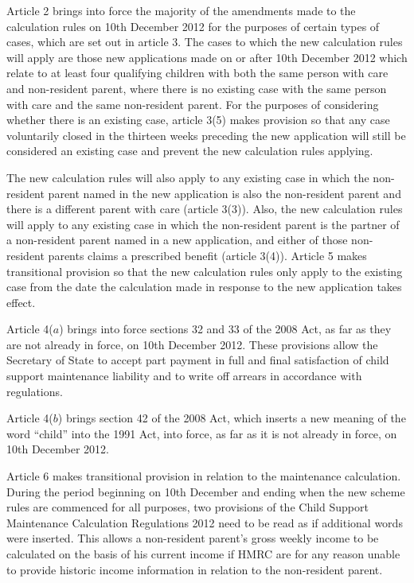 \documentclass[12pt,a4paper]{article}
\begin{document}
Article 2 brings into force the majority of the amendments made to the calculation rules on 10th December 2012 for the purposes of certain types of cases, which are set out in article 3. The cases to which the new calculation rules will apply are those new applications made on or after 10th December 2012 which relate to at least four qualifying children with both the same person with care and non-resident parent, where there is no existing case with the same person with care and the same non-resident parent. For the purposes of considering whether there is an existing case, article 3(5) makes provision so that any case voluntarily closed in the thirteen weeks preceding the new application will still be considered an existing case and prevent the new calculation rules applying.

The new calculation rules will also apply to any existing case in which the non-resident parent named in the new application is also the non-resident parent and there is a different parent with care (article 3(3)). Also, the new calculation rules will apply to any existing case in which the non-resident parent is the partner of a non-resident parent named in a new application, and either of those non-resident parents claims a prescribed benefit (article 3(4)). Article 5 makes transitional provision so that the new calculation rules only apply to the existing case from the date the calculation made in response to the new application takes effect.

Article 4($a$)  brings into force sections 32 and 33 of the 2008 Act, as far as they are not already in force, on 10th December 2012. These provisions allow the Secretary of State to accept part payment in full and final satisfaction of child support maintenance liability and to write off arrears in accordance with regulations.

Article 4($b$)  brings section 42 of the 2008 Act, which inserts a new meaning of the word “child” into the 1991 Act, into force, as far as it is not already in force, on 10th December 2012.

Article 6 makes transitional provision in relation to the maintenance calculation. During the period beginning on 10th December and ending when the new scheme rules are commenced for all purposes, two provisions of the Child Support Maintenance Calculation Regulations 2012 need to be read as if additional words were inserted. This allows a non-resident parent’s gross weekly income to be calculated on the basis of his current income if HMRC are for any reason unable to provide historic income information in relation to the non-resident parent. 
\end{document}
